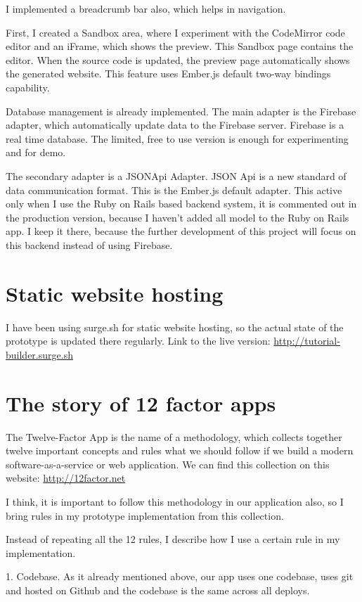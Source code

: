 \documentclass[12pt, a4paper, oneside, openright, medskipamount]{report}
\begin{document}
I implemented a breadcrumb bar also, which helps in navigation.

First, I created a Sandbox area, where I experiment with the CodeMirror code editor and an iFrame, which shows the preview. This Sandbox page contains the editor. When the source code is updated, the preview page automatically shows the generated website. This feature uses Ember.js default two-way bindings capability.

Database management is already implemented. The main adapter is the Firebase adapter, which automatically update data to the Firebase server. Firebase is a real time database. The limited, free to use version is enough for experimenting and for demo.

The secondary adapter is a JSONApi Adapter. JSON Api \cite{jsonapi} is a new standard of data communication format. This is the Ember.js default adapter. This active only when I use the Ruby on Rails based backend system, it is commented out in the production version, because I haven't added all model to the Ruby on Rails app. I keep it there, because the further development of this project will focus on this backend instead of using Firebase.

\section{Static website hosting}

I have been using surge.sh \cite{surge} for static website hosting, so the actual state of the prototype is updated there regularly. Link to the live version: \url{http://tutorial-builder.surge.sh}

\section{The story of 12 factor apps}

The Twelve-Factor App is the name of a methodology, which collects together twelve important concepts and rules what we should follow if we build a modern software-as-a-service or web application. We can find this collection on this website: \url{http://12factor.net}

I think, it is important to follow this methodology in our application also, so I bring rules in my prototype implementation from this collection.

Instead of repeating all the 12 rules, I describe how I use a certain rule in my implementation.

1. Codebase. As it already mentioned above, our app uses one codebase, uses git and hosted on Github and the codebase is the same across all deploys.
\end{document}
